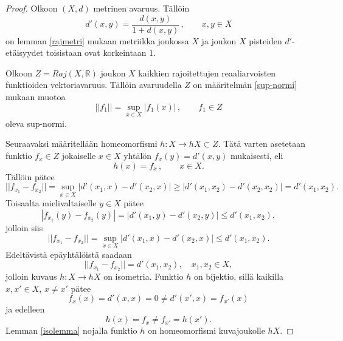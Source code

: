 \documentclass[12pt,a4paper,leqno]{report}
\newcommand{\R}{\mathbb{R}}
\theoremstyle{plain}
\theoremstyle{definition}
\theoremstyle{remark}
\begin{document}
\begin{proof} Olkoon $(X,d)$ metrinen avaruus. Tällöin 
$$d'(x,y)=\dfrac{d(x,y)}{1+d(x,y)} \, , \qquad x,y\in X$$
on lemman \ref{rajmetri} mukaan metriikka joukossa $X$ ja joukon $X$ pisteiden $d'$-etäisyydet toisistaan ovat korkeintaan $1$.


Olkoon $Z=Raj(X,\R )$ joukon $X$ kaikkien rajoitettujen %
reaaliarvoisten funktioiden vektoriavaruus. Tällöin avaruudella $Z$ on määritelmän \ref{sup-normi} mukaan muotoa
$$||f_1||=\sup_{x\in X} |f_1(x)| \, , \qquad f_1\in Z$$
oleva sup-normi.

Seuraavaksi määritellään homeomorfismi $h\colon X\rightarrow hX\subset Z$. Tätä varten asetetaan funktio $f_x\in Z$ jokaiselle $x\in X$ yhtälön $f_x (y)=d'(x,y)$ mukaisesti, eli
$$h(x)=f_x\, ,\qquad x\in X. $$  Tällöin pätee 
$$||f_{x_1} - f_{x_2} ||=\sup_{x\in X} |d'(x_1 , x )-d'(x_2 , x )| \geq |d'(x_1 , x_2 )-d'(x_2 , x_2 )|=d'(x_1 ,x_2 ).$$ 
Toisaalta mielivaltaiselle $y\in X$ pätee
$$|f_{x_1} (y)- f_{x_2} (y)|=|d'(x_1 ,y )-d'(x_2 ,y)|\leq d'(x_1 , x_2 ),$$
jolloin siis 
$$||f_{x_1}-f_{x_2}||=\sup_{x\in X} |d'(x_1 , x )-d'(x_2 , x )|\leq d'(x_1 , x_2 ).$$ 
Edeltävistä epäyhtälöistä saadaan 
\begin{equation}
\label{normimetri}||f_{x_1}-f_{x_2}||= d'(x_1 , x_2 ),\quad  x_1,x_2 \in X,
\end{equation}
jolloin kuvaus $h\colon X\rightarrow hX$  on isometria.
Funktio $h$ on bijektio, sillä kaikilla $x,x'\in X$, $x\neq x'$ pätee 
$$ f_x (x)=d'(x,x)=0\neq d'(x',x)=f_{x'} (x)$$ 
ja edelleen 
$$h(x)=f_x \neq f_{x'}=h(x') .$$ 
Lemman \ref{isolemma} nojalla funktio $h$ on homeomorfismi kuvajoukolle $hX$.


\end{proof}
\end{document}
